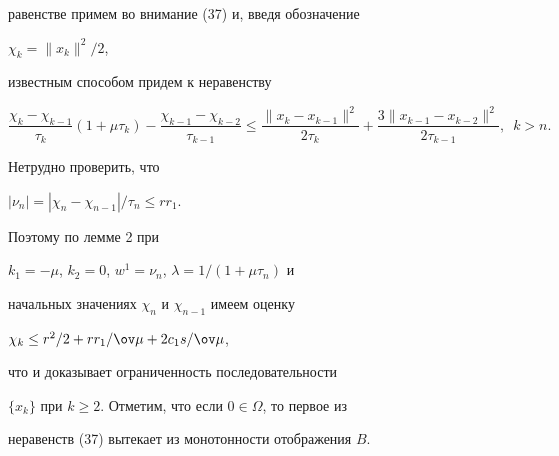 \begin{note}
равенстве примем во внимание (37) и, введя обозначение


$\chi_k=\|x_k\|^2/2$,


известным способом придем к неравенству


$$


\frac{\chi_k-\chi_{k-1}}{\tau_k}(1+\mu \tau_k)-\frac{\chi


_{k-1}-\chi_


{k-2}}{\tau_{k-1}}\leq \frac{\|x_k-x_{k-1}\|^2}{2\tau_k}+


\frac{3\|x_{k-1}-x_{k-2}\|^2}{2\tau_{k-1}},\ \;k>n.


$$


Нетрудно проверить, что


$| \nu_n| = | \chi_n-\chi_{n-1}|/\tau_n\leq rr_1$.


Поэтому по лемме 2 при


$k_1=-\mu$, $k_2=0$, $w^1 =\nu_n$, $\lambda =1/(1+\mu \tau_n)$ и


начальных значениях $\chi_n$ и $\chi_{n-1}$ имеем оценку


$\chi_k\leq r^2/2+rr_1/\ov \mu + 2c_1s/\ov \mu$,


что и доказывает ограниченность последовательности


$\{x_k\}$ при $k\geq 2$. Отметим, что если $0\in \Omega $, то первое из


неравенств (37) вытекает из монотонности отображения $B$.


\end{note}





